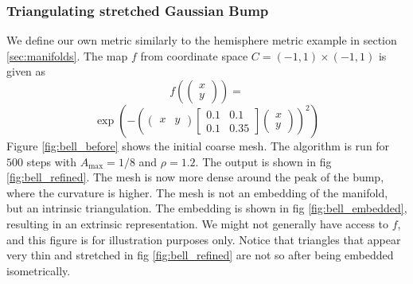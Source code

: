 \subsubsection*{Triangulating stretched Gaussian Bump}
We define our own metric similarly to the hemisphere metric example in section \ref{sec:manifolds}.
The map $f$ from coordinate space $C = (-1, 1) \times (-1, 1)$ is given as 
$$f(\begin{pmatrix}
    x \\ y
\end{pmatrix}) = $$
$$\exp\left(-\left(\begin{pmatrix}
    x & y
\end{pmatrix} \begin{bmatrix} 0.1 & 0.1 \\ 0.1 & 0.35 \end{bmatrix} \begin{pmatrix}
    x \\ y
\end{pmatrix}\right)^2\right)$$
Figure \ref{fig:bell_before} shows the initial coarse mesh. The algorithm is run for $500$ steps with $A_{\text{max}} = 1/8$ and $\rho = 1.2$. The output is shown in fig \ref{fig:bell_refined}. The mesh is now more dense around the peak of the bump, where the curvature is higher. The mesh is not an embedding of the manifold, but an intrinsic triangulation. The embedding is shown in fig \ref{fig:bell_embedded}, resulting in an extrinsic representation. We might not generally have access to $f$, and this figure is for illustration purposes only. Notice that triangles that appear very thin and stretched in fig \ref{fig:bell_refined} are not so after being embedded isometrically.
